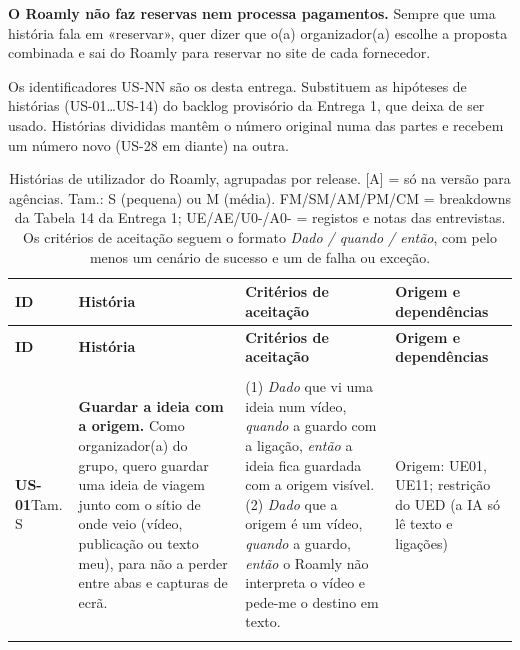 \textbf{O Roamly não faz reservas nem processa pagamentos.} Sempre que uma história fala em «reservar», quer dizer que o(a) organizador(a) escolhe a proposta combinada e sai do Roamly para reservar no site de cada fornecedor.

Os identificadores US-NN são os desta entrega. Substituem as hipóteses de histórias (US-01\ldots{}US-14) do backlog provisório da Entrega 1, que deixa de ser usado. Histórias divididas mantêm o número original numa das partes e recebem um número novo (US-28 em diante) na outra.

{\small
\setlength{\tabcolsep}{4pt}
\begin{longtable}{@{}p{1.5cm}p{5.1cm}p{5.2cm}p{3.6cm}@{}}
\caption[Histórias de utilizador do Roamly, agrupadas por release.]{Histórias de utilizador do Roamly, agrupadas por release. [A] = só na versão para agências. Tam.: S (pequena) ou M (média). FM/SM/AM/PM/CM = breakdowns da Tabela 14 da Entrega 1; UE/AE/U0-/A0- = registos e notas das entrevistas. Os critérios de aceitação seguem o formato \textit{Dado / quando / então}, com pelo menos um cenário de sucesso e um de falha ou exceção.}\label{tab:historias}\\
\toprule \textbf{ID} & \textbf{História} & \textbf{Critérios de aceitação} & \textbf{Origem e dependências} \\ \midrule
\endfirsthead
\toprule \textbf{ID} & \textbf{História} & \textbf{Critérios de aceitação} & \textbf{Origem e dependências} \\ \midrule
\endhead
\bottomrule \endfoot
\multicolumn{4}{@{}l}{\textbf{Release 1 — Da ideia ao combinado (esqueleto andante do viajante)}} \\ \midrule
\textbf{US-01}\newline Tam. S & \textbf{Guardar a ideia com a origem.} Como organizador(a) do grupo, quero guardar uma ideia de viagem junto com o sítio de onde veio (vídeo, publicação ou texto meu), para não a perder entre abas e capturas de ecrã. & (1) \textit{Dado} que vi uma ideia num vídeo, \textit{quando} a guardo com a ligação, \textit{então} a ideia fica guardada com a origem visível.\newline (2) \textit{Dado} que a origem é um vídeo, \textit{quando} a guardo, \textit{então} o Roamly não interpreta o vídeo e pede-me o destino em texto. & Origem: UE01, UE11; restrição do UED (a IA só lê texto e ligações) \\ \addlinespace

\end{longtable}}
